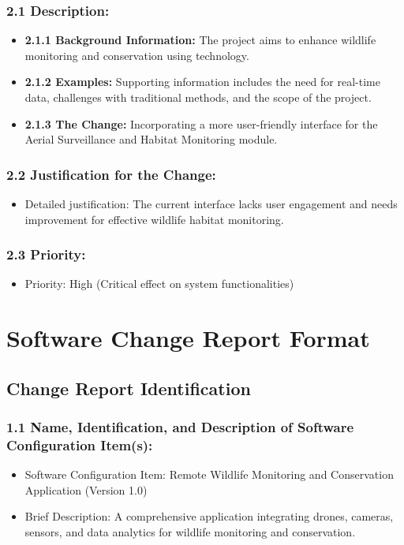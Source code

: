 \documentclass{article}
\begin{document}
\subsubsection*{2.1 Description:}
\begin{itemize}
  \item \textbf{2.1.1 Background Information:} The project aims to enhance wildlife monitoring and conservation using technology.
  \item \textbf{2.1.2 Examples:} Supporting information includes the need for real-time data, challenges with traditional methods, and the scope of the project.
  \item \textbf{2.1.3 The Change:} Incorporating a more user-friendly interface for the Aerial Surveillance and Habitat Monitoring module.
\end{itemize}

\subsubsection*{2.2 Justification for the Change:}
\begin{itemize}
  \item Detailed justification: The current interface lacks user engagement and needs improvement for effective wildlife habitat monitoring.
\end{itemize}

\subsubsection*{2.3 Priority:}
\begin{itemize}
  \item Priority: High (Critical effect on system functionalities)
\end{itemize}

\section*{Software Change Report Format}

\subsection*{Change Report Identification}

\subsubsection*{1.1 Name, Identification, and Description of Software Configuration Item(s):}
\begin{itemize}
  \item Software Configuration Item: Remote Wildlife Monitoring and Conservation Application (Version 1.0)
  \item Brief Description: A comprehensive application integrating drones, cameras, sensors, and data analytics for wildlife monitoring and conservation.
\end{itemize}
\end{document}
